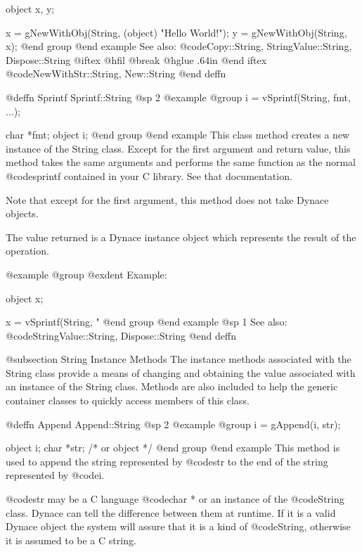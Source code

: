 object  x, y;

x = gNewWithObj(String, (object) "Hello World!");
y = gNewWithObj(String, x);
@end group
@end example
See also:  @code{Copy::String, StringValue::String, Dispose::String}
@iftex
@hfil @break @hglue .64in      
@end iftex
@code{NewWithStr::String, New::String}
@end deffn












@deffn {Sprintf} Sprintf::String
@sp 2
@example
@group
i = vSprintf(String, fmt, ...);

char    *fmt;
object  i;
@end group
@end example
This class method creates a new instance of the String class.  Except
for the first argument and return value, this method takes the same
arguments and performs the same function as the normal @code{sprintf}
contained in your C library.  See that documentation.

Note that except for the first argument, this method does not take
Dynace objects.

The value returned is a Dynace instance object which represents the result
of the operation.

@example
@group
@exdent Example:

object  x;

x = vSprintf(String, "%
@end group
@end example
@sp 1
See also:  @code{StringValue::String, Dispose::String}
@end deffn





@subsection String Instance Methods
The instance methods associated with the String class provide a
means of changing and obtaining the value associated with an instance of
the String class.  Methods are also included to help the generic
container classes to quickly access members of this class.








@deffn {Append} Append::String
@sp 2
@example
@group
i = gAppend(i, str);

object  i;
char    *str;  /*  or object  */
@end group
@end example
This method is used to append the string represented by @code{str}
to the end of the string represented by @code{i}.

@code{str} may be a C language @code{char *} or an instance of the
@code{String} class.  Dynace can tell the difference between them at
runtime.  If it is a valid Dynace object the system will assure that it is
a kind of @code{String}, otherwise it is assumed to be a C string.

